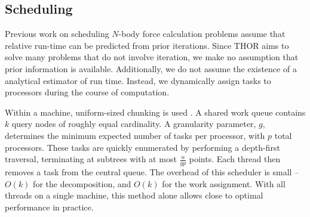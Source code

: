 \documentclass[twoside,leqno,twocolumn]{article}
\newcommand{\authornote}[1]{\footnote{Note to self: #1}}
\newcommand{\authorsnote}[1]{\authornote{#1}}
\begin{document}
\subsection{Scheduling}

Previous work \cite{salmon_thesis, singh_thesis} on scheduling $N$-body force calculation problems assume that relative run-time can be predicted from prior iterations.
Since THOR aims to solve many problems that do not involve iteration, we make no assumption that prior information is available.
Additionally, we do not assume the existence of a analytical estimator of run time.
Instead, we dynamically assign tasks to processors during the course of computation.


Within a machine, uniform-sized chunking is used \cite{kruskal85allocating}.
A shared work queue contains $k$ query nodes of roughly equal cardinality.
A granularity parameter, $g$, determines the minimum expected number of tasks per processor, with $p$ total processors.
These tasks are quickly enumerated by performing a depth-first traversal, terminating at subtrees with at most $\frac{n}{gp}$ points.
Each thread then removes a task from the central queue.
The overhead of this scheduler is small -- $O(k)$ for the decomposition, and $O(k)$ for the work assignment.
With all threads on a single machine, this method alone allows close to optimal performance in practice.
\end{document}
